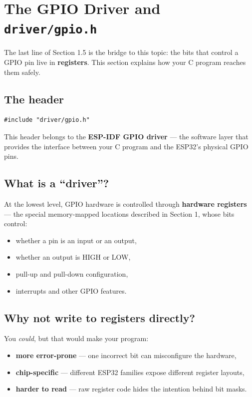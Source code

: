 \documentclass[11pt]{article}
\begin{document}
\newpage

\section{The GPIO Driver and \texttt{driver/gpio.h}}

The last line of Section 1.5 is the bridge to this topic: the bits that control a GPIO pin live in \textbf{registers}. This section explains how your C program reaches them safely.

\subsection{The header}

\begin{verbatim}
#include "driver/gpio.h"
\end{verbatim}

This header belongs to the \textbf{ESP-IDF GPIO driver} --- the software layer that provides the interface between your C program and the ESP32's physical GPIO pins.

\subsection{What is a ``driver''?}

At the lowest level, GPIO hardware is controlled through \textbf{hardware registers} --- the special memory-mapped locations described in Section 1, whose bits control:

\begin{itemize}
    \item whether a pin is an input or an output,
    \item whether an output is HIGH or LOW,
    \item pull-up and pull-down configuration,
    \item interrupts and other GPIO features.
\end{itemize}

\subsection{Why not write to registers directly?}

You \emph{could}, but that would make your program:

\begin{itemize}
    \item \textbf{more error-prone} --- one incorrect bit can misconfigure the hardware,
    \item \textbf{chip-specific} --- different ESP32 families expose different register layouts,
    \item \textbf{harder to read} --- raw register code hides the intention behind bit masks.
\end{itemize}
\end{document}
